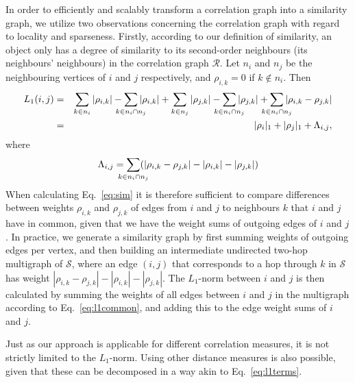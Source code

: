 \documentclass{kais}
\newcommand{\rn}[1]{\rho_{#1}}
\newcommand{\rns}[1]{|\rn{#1}|_1}
\newcommand{\nm}[1]{L_1(#1)}
\begin{document}
In order to efficiently and scalably transform a correlation graph into a similarity graph, we utilize two observations
concerning the correlation graph with regard to locality and sparseness. 
Firstly, according to our definition of similarity, an object only has a degree of similarity to its second-order
neighbours (its neighbours' neighbours) in the
correlation graph $\mathcal{R}$. Let $n_i$ and $n_j$ be the neighbouring vertices of $i$ and $j$ respectively, and $\rn{i,
k} = 0$ if $k \not\in n_i$. Then
\begin{eqnarray}
\nm{i,j}  & = &
\sum_{k \in n_i}  |\rn{i, k}| -  \sum_{\mathclap{k \in n_i \cap n_j}}  |\rn{i, k}|
+  \sum_{k \in n_j}  |\rn{j, k}| -  \sum_{\mathclap{k \in n_i \cap n_j}}  |\rn{j, k}|
+  \sum_{\mathclap{k \in n_i \cap n_j}} |\rn{i, k} - \rn{j, k}| \notag\\
& = & \rns{i} + \rns{j} + \Lambda_{i,j}, 
\label{eq:l1terms}
\end{eqnarray}
where
\begin{equation}
\Lambda_{i,j} = \sum_{\mathclap{k \in n_i \cap n_j}} (|\rn{i, k} - \rn{j, k}| - |\rn{i, k}| - |\rn{j, k}|)
\label{eq:l1common}
\end{equation}
When calculating Eq.\ \ref{eq:sim} it is therefore sufficient to compare differences between weights $\rn{i, k}$ and
$\rn{j, k}$ of edges from $i$ and $j$ to neighbours $k$ that $i$ and $j$ have in common, given that we have the weight
sums of outgoing edges of $i$ and $j$.
In practice, we generate a similarity graph by first summing weights of outgoing edges per vertex, and then building an
intermediate undirected two-hop multigraph of $\mathcal{S}$, where an edge $(i, j)$ that corresponds to a hop through
$k$ in $\mathcal{S}$ has weight $|\rn{i, k} - \rn{j, k}| - |\rn{i, k}| - |\rn{j, k}|$. The $L_1$-norm between $i$ and
$j$ is then calculated by summing the weights of all edges between $i$ and $j$ in the multigraph according to Eq.\
\ref{eq:l1common}, and adding this to the edge weight sums of $i$ and $j$.

Just as our approach is applicable for different correlation measures, it is not strictly limited to the $L_1$-norm. Using 
other distance measures is also possible, given that these can be decomposed in a way akin to Eq.~\ref{eq:l1terms}. 
\end{document}
